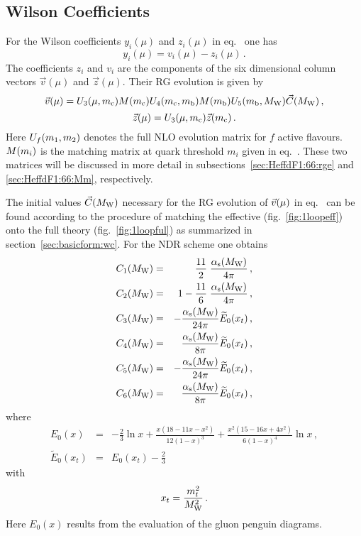 \subsection{Wilson Coefficients}
            \label{sec:HeffdF1:66:wc}
For the Wilson coefficients $y_i(\mu)$ and $z_i(\mu)$ in
eq.~ one has
\begin{equation}
y_i(\mu) = v_i(\mu) - z_i(\mu) \, .
\label{eq:WCy}
\end{equation}
The coefficients $z_i$ and $v_i$ are the components of the six
dimensional column vectors $\vec{v}(\mu)$ and $\vec{z}(\mu)$. Their
RG evolution is given by
\begin{equation}
\vec{v}(\mu) =
U_3(\mu,m_{\rm c}) M(m_{\rm c}) U_4(m_{\rm c},m_{\rm b}) M(m_{\rm b}) U_5(m_{\rm b},M_{\rm W})
\vec{C}(M_{\rm W}) \, ,
\label{eq:WCv}
\end{equation}
\begin{equation}
\vec{z}(\mu) = U_3(\mu,m_{\rm c}) \vec{z}(m_{\rm c}) \, .
\label{eq:WCz}
\end{equation}
Here $U_f(m_1,m_2)$ denotes the full NLO evolution matrix for
$f$ active flavours. $M(m_i)$ is the matching matrix at quark
threshold $m_i$ given in eq.\ .  These two matrices will be
discussed in more detail in subsections~\ref{sec:HeffdF1:66:rge} and
\ref{sec:HeffdF1:66:Mm}, respectively.

The initial values $\vec{C}(M_{\rm W})$ necessary for the RG evolution of
$\vec{v}(\mu)$ in eq.~ can be found according to the procedure
of matching the effective (fig.\ \ref{fig:1loopeff}) onto the full
theory (fig.\ \ref{fig:1loopful}) as summarized in
section~\ref{sec:basicform:wc}.  For the NDR scheme one obtains
\cite{burasetal:92a}
\begin{eqnarray}
C_1(M_{\rm W}) &=&     \frac{11}{2} \; \frac{\alpha_{\rm s}(M_{\rm W})}{4\pi} \, ,
\label{eq:CMw1QCD} \\
C_2(M_{\rm W}) &=& 1 - \frac{11}{6} \; \frac{\alpha_{\rm s}(M_{\rm W})}{4\pi} \, ,
\label{eq:CMw2QCD} \\
C_3(M_{\rm W}) &=& -\frac{\alpha_{\rm s}(M_{\rm W})}{24\pi} \widetilde{E}_0(x_t) \, ,
\label{eq:CMw3QCD} \\
C_4(M_{\rm W}) &=& \frac{\alpha_{\rm s}(M_{\rm W})}{8\pi} \widetilde{E}_0(x_t) \, ,
\label{eq:CMw4QCD} \\
C_5(M_{\rm W}) &=& -\frac{\alpha_{\rm s}(M_{\rm W})}{24\pi} \widetilde{E}_0(x_t) \, ,
\label{eq:CMw5QCD} \\
C_6(M_{\rm W}) &=& \frac{\alpha_{\rm s}(M_{\rm W})}{8\pi} \widetilde{E}_0(x_t) \, ,
\label{eq:CMw6QCD}
\end{eqnarray}
where
\begin{eqnarray}
E_0(x) &=& -\frac{2}{3} \ln x + \frac{x (18 -11 x - x^2)}{12 (1-x)^3} +
          \frac{x^2 (15 - 16 x  + 4 x^2)}{6 (1-x)^4} \ln x \, ,
\label{eq:Ext} \\
\widetilde{E}_0(x_t) &=& E_0(x_t) - \frac{2}{3}
\label{eq:Exttilde}
\end{eqnarray}
with
\begin{equation}
x_t = \frac{m_t^2}{M_{\rm W}^2} \, .
\label{eq:xt}
\end{equation}
Here $E_0(x)$ results from the evaluation of the gluon penguin diagrams.

